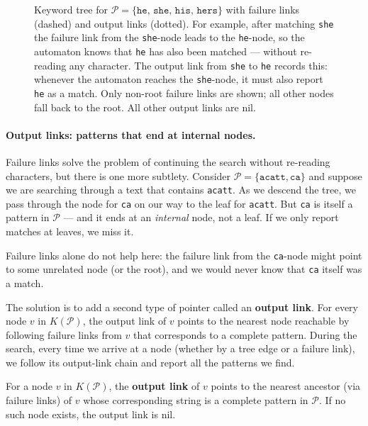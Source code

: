\begin{figure}[H]
\begin{tikzpicture}
\end{tikzpicture}
\caption{%
  Keyword tree for
  $\mathcal{P} = \{\texttt{he},\,\texttt{she},\,\texttt{his},\,\texttt{hers}\}$
  with failure links (dashed) and output links (dotted).
  For example, after matching \texttt{she} the failure link from the
  \texttt{she}-node leads to the \texttt{he}-node, so the automaton
  knows that \texttt{he} has also been matched --- without re-reading
  any character.  The output link from \texttt{she} to \texttt{he}
  records this: whenever the automaton reaches the \texttt{she}-node,
  it must also report \texttt{he} as a match.
  Only non-root failure links are shown; all other nodes fall back to
  the root.  All other output links are nil.
}
\label{fig:keyword-tree-failure}
\end{figure}

\paragraph{Output links: patterns that end at internal nodes.}
Failure links solve the problem of continuing the search without
re-reading characters, but there is one more subtlety.
Consider $\mathcal{P} = \{\texttt{acatt},\texttt{ca}\}$ and suppose we
are searching through a text that contains \texttt{acatt}.
As we descend the tree, we pass through the node for \texttt{ca} on our
way to the leaf for \texttt{acatt}.
But \texttt{ca} is itself a pattern in $\mathcal{P}$ --- and it ends at
an \emph{internal} node, not a leaf.
If we only report matches at leaves, we miss it.

Failure links alone do not help here: the failure link from the
\texttt{ca}-node might point to some unrelated node (or the root), and
we would never know that \texttt{ca} itself was a match.

The solution is to add a second type of pointer called an
\textbf{output link}.
For every node $v$ in $K(\mathcal{P})$, the output link of $v$ points
to the nearest node reachable by following failure links from $v$ that
corresponds to a complete pattern.
During the search, every time we arrive at a node (whether by a tree
edge or a failure link), we follow its output-link chain and report all
the patterns we find.

\begin{definition}
  For a node $v$ in $K(\mathcal{P})$, the \textbf{output link} of $v$
  points to the nearest ancestor (via failure links) of $v$ whose
  corresponding string is a complete pattern in $\mathcal{P}$.
  If no such node exists, the output link is $\mathrm{nil}$.
\end{definition}


